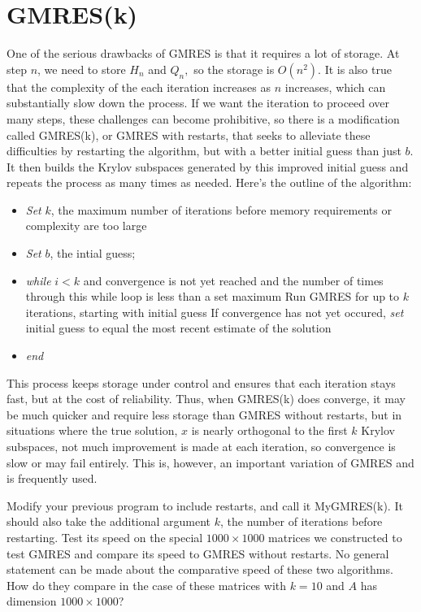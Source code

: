 \section*{GMRES(k)}

One of the serious drawbacks of GMRES is that it requires a lot of storage.
At step $n$, we need to store $H_n$ and $Q_n,$ so the storage is $O(n^2).$
It is also true that the complexity of the each iteration increases as $n$ increases, which can substantially slow down the process.
If we want the iteration to proceed over many steps, these challenges can become prohibitive, so there is a modification called GMRES(k), or GMRES with restarts, that seeks to alleviate these difficulties by restarting the algorithm, but with a better initial guess than just $b$.
It then builds the Krylov subspaces generated by this improved initial guess and repeats the process as many times as needed.
Here's the outline of the algorithm:
\begin{itemize}
\item \emph{Set} $k$, the maximum number of iterations before memory requirements or complexity are too large
\item \emph{Set} $b$, the intial guess;
\item \emph{while} $i<k$ and convergence is not yet reached and the number of times through this while loop is less than a set maximum
\subitem Run GMRES for up to $k$ iterations, starting with initial guess
\subitem If convergence has not yet occured, \emph{set} initial guess to equal the most recent estimate of the solution
\item \emph{end} 
\end{itemize}

This process keeps storage under control and ensures that each iteration stays fast, but at the cost of reliability.
Thus, when GMRES(k) does converge, it may be much quicker and require less storage than GMRES without restarts, but in situations where the true solution, $x$ is nearly orthogonal to the first $k$ Krylov subspaces, not much improvement is made at each iteration, so convergence is slow or may fail entirely.
This is, however, an important variation of GMRES and is frequently used.

\begin{problem}
\label{prob:GMRES3}
Modify your previous program to include restarts, and call it MyGMRES(k).
It should also take the additional argument $k$, the number of iterations before restarting.
Test its speed on the special $1000\times 1000$ matrices we constructed to test GMRES and compare its speed to GMRES without restarts.
No general statement can be made about the comparative speed of these two algorithms.
How do they compare in the case of these matrices with $k=10$ and $A$ has dimension $1000\times 1000$?
\end{problem}

